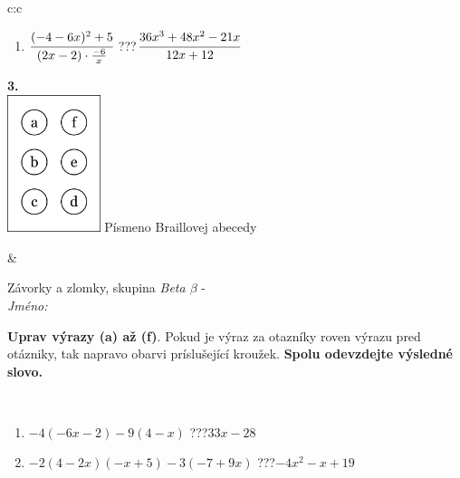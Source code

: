 \documentclass[10pt]{report}
\begin{document}
\begin{tabular}{c:c}
\begin{minipage}[c][104.5mm][t]{0.5\linewidth}
\begin{center}
\begin{minipage}{0.79\linewidth}
\begin{center}
\begin{varwidth}{\linewidth}
\begin{enumerate}
\item $\cfrac{(-4-6x)^2+5}{(2x-2)\cdot\frac{-6}{x}}$\quad \dotfill\; ???\;\dotfill \quad $\cfrac{36x^3+48x^2-21x}{12x+12}$
\end{enumerate}
\end{varwidth}
\end{center}
\end{minipage}
\begin{minipage}{0.20\linewidth}
\begin{center}
{\Huge\bfseries 3.} \\[2mm]
\includegraphics[height=40mm]{../images/braille.png}
{\small Písmeno Braillovej abecedy}
\end{center}
\end{minipage}
\end{center}
\end{minipage}
&
\begin{minipage}[c][104.5mm][t]{0.5\linewidth}
\begin{center}
\vspace{7mm}
{\huge Závorky a zlomky, skupina \textit{Beta $\beta$} -}\\[5mm]
\textit{Jméno:}\phantom{xxxxxxxxxxxxxxxxxxxxxxxxxxxxxxxxxxxxxxxxxxxxxxxxxxxxxxxxxxxxxxxxx}\\[5mm]
\begin{minipage}{0.95\linewidth}
\begin{center}
\textbf{Uprav výrazy (a) až (f)}. Pokud je výraz za otazníky roven výrazu pred otázniky, tak napravo obarvi príslušející kroužek. \textbf{Spolu odevzdejte výsledné slovo.}
\end{center}
\end{minipage}
\\[1mm]
\begin{minipage}{0.79\linewidth}
\begin{center}
\begin{varwidth}{\linewidth}
\begin{enumerate}
\normalsize
\item $-4(-6x-2)-9(4-x)$\quad \dotfill\; ???\;\dotfill \quad $33x-28$
\item $-2(4-2x)(-x+5)-3(-7+9x)$\quad \dotfill\; ???\;\dotfill \quad $-4x^2-x+19$

\end{enumerate}
\end{varwidth}
\end{center}
\end{minipage}
\end{center}
\end{minipage}
\end{tabular}
\end{document}
